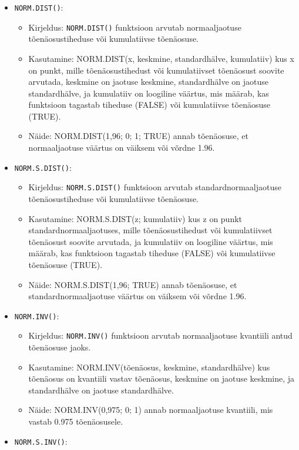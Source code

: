 \documentclass[
]{book}
\providecommand{\tightlist}{%
  \setlength{\itemsep}{0pt}\setlength{\parskip}{0pt}}
\begin{document}
\begin{itemize}
\tightlist
\item
  \texttt{NORM.DIST()}:

  \begin{itemize}
  \tightlist
  \item
    Kirjeldus: \texttt{NORM.DIST()} funktsioon arvutab normaaljaotuse tõenäosustiheduse või kumulatiivse tõenäosuse.
  \item
    Kasutamine: NORM.DIST(x, keskmine, standardhälve, kumulatiiv) kus x on punkt, mille tõenäosustihedust või kumulatiivset tõenäosust soovite arvutada, keskmine on jaotuse keskmine, standardhälve on jaotuse standardhälve, ja kumulatiiv on loogiline väärtus, mis määrab, kas funktsioon tagastab tiheduse (FALSE) või kumulatiivse tõenäosuse (TRUE).
  \item
    Näide: NORM.DIST(1,96; 0; 1; TRUE) annab tõenäosuse, et normaaljaotuse väärtus on väiksem või võrdne 1.96.
  \end{itemize}
\item
  \texttt{NORM.S.DIST()}:

  \begin{itemize}
  \tightlist
  \item
    Kirjeldus: \texttt{NORM.S.DIST()} funktsioon arvutab standardnormaaljaotuse tõenäosustiheduse või kumulatiivse tõenäosuse.
  \item
    Kasutamine: NORM.S.DIST(z; kumulatiiv) kus z on punkt standardnormaaljaotuses, mille tõenäosustihedust või kumulatiivset tõenäosust soovite arvutada, ja kumulatiiv on loogiline väärtus, mis määrab, kas funktsioon tagastab tiheduse (FALSE) või kumulatiivse tõenäosuse (TRUE).
  \item
    Näide: NORM.S.DIST(1,96; TRUE) annab tõenäosuse, et standardnormaaljaotuse väärtus on väiksem või võrdne 1.96.
  \end{itemize}
\item
  \texttt{NORM.INV()}:

  \begin{itemize}
  \tightlist
  \item
    Kirjeldus: \texttt{NORM.INV()} funktsioon arvutab normaaljaotuse kvantiili antud tõenäosuse jaoks.
  \item
    Kasutamine: NORM.INV(tõenäosus, keskmine, standardhälve) kus tõenäosus on kvantiili vastav tõenäosus, keskmine on jaotuse keskmine, ja standardhälve on jaotuse standardhälve.
  \item
    Näide: NORM.INV(0,975; 0; 1) annab normaaljaotuse kvantiili, mis vastab 0.975 tõenäosusele.
  \end{itemize}
\item
  \texttt{NORM.S.INV()}:


\end{itemize}
\end{document}
